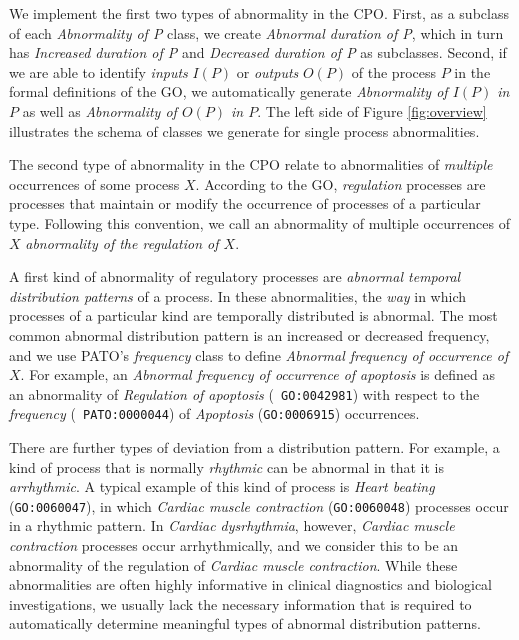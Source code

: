 \documentclass{bioinfo}
\begin{document}
We implement the first two types of abnormality in the CPO. First, as
a subclass of each {\em Abnormality of P} class, we create {\em
  Abnormal duration of P}, which in turn has {\em Increased duration
  of P} and {\em Decreased duration of P} as subclasses. Second, if we
are able to identify {\em inputs} $I(P)$ or {\em outputs} $O(P)$ of
the process $P$ in the formal definitions of the GO, we automatically
generate {\em Abnormality of $I(P)$ in $P$} as well as {\em
  Abnormality of $O(P)$ in $P$}.  The left side of Figure
\ref{fig:overview} illustrates the schema of classes we generate for
single process abnormalities.

The second type of abnormality in the CPO relate to abnormalities of
{\em multiple} occurrences of some process $X$. According to the GO,
{\em regulation} processes are processes that maintain or modify the
occurrence of processes of a particular type. Following this
convention, we call an abnormality of multiple occurrences of $X$ {\em
  abnormality of the regulation of $X$}.

A first kind of abnormality of regulatory processes are {\em abnormal
  temporal distribution patterns} of a process. In these
abnormalities, the {\em way} in which processes of a particular kind
are temporally distributed is abnormal.  The most common abnormal
distribution pattern is an increased or decreased frequency, and we
use PATO's {\em frequency} class to define {\em Abnormal frequency of
  occurrence of $X$}.
For example, an {\em Abnormal frequency of occurrence of apoptosis} is
defined as an abnormality of {\em Regulation of apoptosis} ({\tt
  GO:0042981}) with respect to the {\em frequency} ({\tt
  PATO:0000044}) of {\em Apoptosis} ({\tt GO:0006915}) occurrences.

There are further types of deviation from a distribution pattern. For
example, a kind of process that is normally {\em rhythmic} can be
abnormal in that it is {\em arrhythmic}. A typical example of this
kind of process is {\em Heart beating} ({\tt GO:0060047}), in which
{\em Cardiac muscle contraction} ({\tt GO:0060048}) processes occur in
a rhythmic pattern. In {\em Cardiac dysrhythmia}, however, {\em
  Cardiac muscle contraction} processes occur arrhythmically, and we
consider this to be an abnormality of the regulation of {\em Cardiac
  muscle contraction}. While these abnormalities are often highly
informative in clinical diagnostics and biological investigations, we
usually lack the necessary information that is required to
automatically determine meaningful types of abnormal distribution
patterns.
\end{document}
